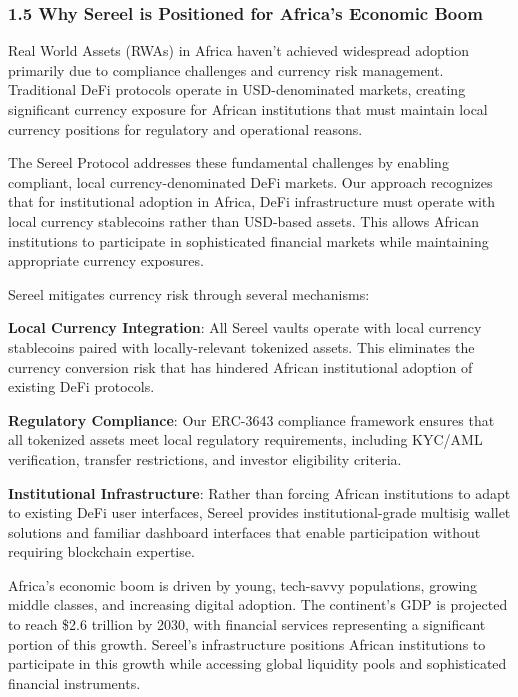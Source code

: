 \documentclass[12pt]{article}
\begin{document}
\subsubsection{1.5 Why Sereel is Positioned for Africa's Economic Boom} %

Real World Assets (RWAs) in Africa haven't achieved widespread adoption primarily due to compliance challenges and currency risk management. Traditional DeFi protocols operate in USD-denominated markets, creating significant currency exposure for African institutions that must maintain local currency positions for regulatory and operational reasons.

The Sereel Protocol addresses these fundamental challenges by enabling compliant, local currency-denominated DeFi markets. Our approach recognizes that for institutional adoption in Africa, DeFi infrastructure must operate with local currency stablecoins rather than USD-based assets. This allows African institutions to participate in sophisticated financial markets while maintaining appropriate currency exposures.

Sereel mitigates currency risk through several mechanisms:

\textbf{Local Currency Integration}: All Sereel vaults operate with local currency stablecoins paired with locally-relevant tokenized assets. This eliminates the currency conversion risk that has hindered African institutional adoption of existing DeFi protocols.

\textbf{Regulatory Compliance}: Our ERC-3643 compliance framework ensures that all tokenized assets meet local regulatory requirements, including KYC/AML verification, transfer restrictions, and investor eligibility criteria.

\textbf{Institutional Infrastructure}: Rather than forcing African institutions to adapt to existing DeFi user interfaces, Sereel provides institutional-grade multisig wallet solutions and familiar dashboard interfaces that enable participation without requiring blockchain expertise.

Africa's economic boom is driven by young, tech-savvy populations, growing middle classes, and increasing digital adoption. The continent's GDP is projected to reach \$2.6 trillion by 2030, with financial services representing a significant portion of this growth. Sereel's infrastructure positions African institutions to participate in this growth while accessing global liquidity pools and sophisticated financial instruments.
\end{document}
